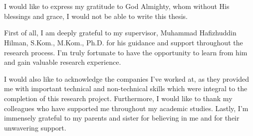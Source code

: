 \chapter*{\kataPengantar}
\pagestyle{first-pages}

I would like to express my gratitude to God Almighty, whom without His blessings and grace, I would not be able to write this thesis.

First of all, I am deeply grateful to my supervisor, Muhammad Hafizhuddin Hilman, S.Kom., M.Kom., Ph.D. for his guidance and support throughout the research process. I'm truly fortunate to have the opportunity to learn from him and gain valuable research experience.

I would also like to acknowledge the companies I've worked at, as they provided me with important technical and non-technical skills which were integral to the completion of this research project. Furthermore, I would like to thank my colleagues who have supported me throughout my academic studies. Lastly, I'm immensely grateful to my parents and sister for believing in me and for their unwavering support.






